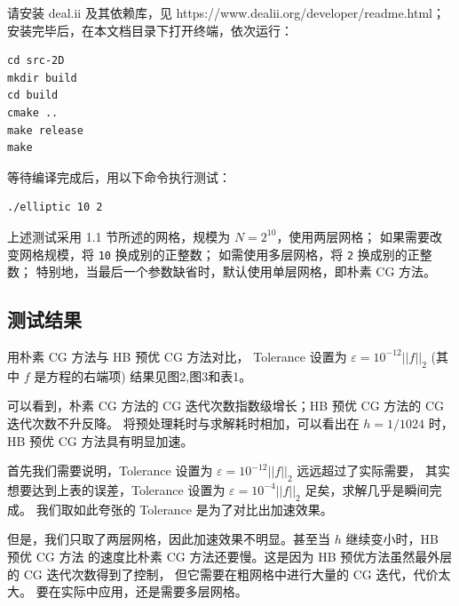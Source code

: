 \documentclass[lang=cn,11pt,a4paper]{elegantpaper}
\begin{document}
请安装 deal.ii 及其依赖库，见 https://www.dealii.org/developer/readme.html；安装完毕后，在本文档目录下打开终端，依次运行：
\begin{lstlisting}
cd src-2D
mkdir build
cd build
cmake ..
make release
make
\end{lstlisting}
等待编译完成后，用以下命令执行测试：
\begin{lstlisting}
./elliptic 10 2
\end{lstlisting}
上述测试采用 1.1 节所述的网格，规模为 $N=2^{10}$，使用两层网格；
如果需要改变网格规模，将 \verb|10| 换成别的正整数；
如需使用多层网格，将 \verb|2| 换成别的正整数；
特别地，当最后一个参数缺省时，默认使用单层网格，即朴素 CG 方法。

\subsection{测试结果}

用朴素 CG 方法与 HB 预优 CG 方法对比，
Tolerance 设置为 $\varepsilon=10^{-12}||f||_2$ (其中 $f$ 是方程的右端项) 结果见图2,图3和表1。

可以看到，朴素 CG 方法的 CG 迭代次数指数级增长；HB 预优 CG 方法的 CG 迭代次数不升反降。
将预处理耗时与求解耗时相加，可以看出在 $h=1/1024$ 时，HB 预优 CG 方法具有明显加速。

首先我们需要说明，Tolerance 设置为 $\varepsilon=10^{-12}||f||_2$ 远远超过了实际需要，
其实想要达到上表的误差，Tolerance 设置为 $\varepsilon=10^{-4}||f||_2$ 足矣，求解几乎是瞬间完成。
我们取如此夸张的 Tolerance 是为了对比出加速效果。

但是，我们只取了两层网格，因此加速效果不明显。甚至当 $h$ 继续变小时，HB 预优 CG 方法
的速度比朴素 CG 方法还要慢。这是因为 HB 预优方法虽然最外层的 CG 迭代次数得到了控制，
但它需要在粗网格中进行大量的 CG 迭代，代价太大。
要在实际中应用，还是需要多层网格。

\vspace{-1em}
\end{document}
